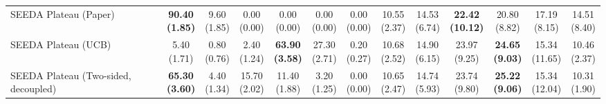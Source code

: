 \begin{table}[H]
{\begin{tabular}{l|cccccc|cccccc}
SEEDA Plateau (Paper) & \bfseries \makecell{90.40 \\ (1.85)} & \makecell{9.60 \\ (1.85)} & {\cellcolor[HTML]{C8E6C9}} \makecell{0.00 \\ (0.00)} & \makecell{0.00 \\ (0.00)} & \makecell{0.00 \\ (0.00)} & \makecell{0.00 \\ (0.00)} & \makecell{10.55 \\ (2.37)} & \makecell{14.53 \\ (6.74)} & {\cellcolor[HTML]{C8E6C9}} \bfseries \makecell{22.42 \\ (10.12)} & \makecell{20.80 \\ (8.82)} & \makecell{17.19 \\ (8.15)} & \makecell{14.51 \\ (8.40)} \\
SEEDA Plateau (UCB) & \makecell{5.40 \\ (1.71)} & \makecell{0.80 \\ (0.76)} & {\cellcolor[HTML]{C8E6C9}} \makecell{2.40 \\ (1.24)} & \bfseries \makecell{63.90 \\ (3.58)} & \makecell{27.30 \\ (2.71)} & \makecell{0.20 \\ (0.27)} & \makecell{10.68 \\ (2.52)} & \makecell{14.90 \\ (6.15)} & {\cellcolor[HTML]{C8E6C9}} \makecell{23.97 \\ (9.25)} & \bfseries \makecell{24.65 \\ (9.03)} & \makecell{15.34 \\ (11.65)} & \makecell{10.46 \\ (2.37)} \\
SEEDA Plateau (Two-sided, decoupled) & \bfseries \makecell{65.30 \\ (3.60)} & \makecell{4.40 \\ (1.34)} & {\cellcolor[HTML]{C8E6C9}} \makecell{15.70 \\ (2.02)} & \makecell{11.40 \\ (1.88)} & \makecell{3.20 \\ (1.25)} & \makecell{0.00 \\ (0.00)} & \makecell{10.65 \\ (2.47)} & \makecell{14.74 \\ (5.93)} & {\cellcolor[HTML]{C8E6C9}} \makecell{23.74 \\ (9.80)} & \bfseries \makecell{25.22 \\ (9.06)} & \makecell{15.34 \\ (12.04)} & \makecell{10.31 \\ (1.90)} \\

\end{tabular}}
\end{table}
